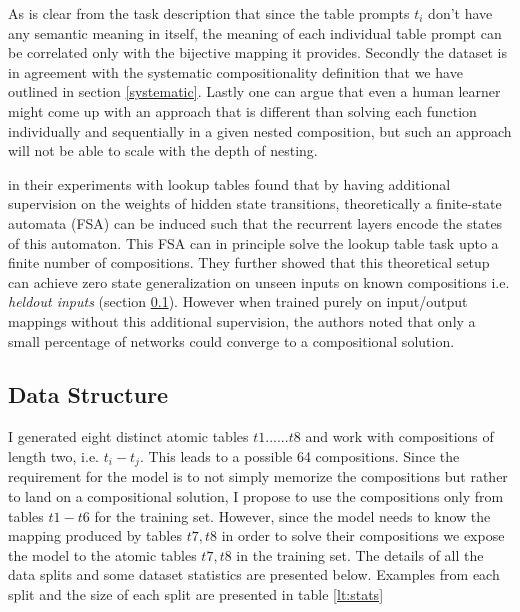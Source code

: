 As is clear from the task description that since the table prompts $t_i$ don't have any semantic meaning in itself, the meaning of each individual table prompt can be correlated only with the bijective mapping it provides. Secondly the dataset is in agreement with the systematic compositionality definition that we have outlined in section \ref{systematic}. Lastly one can argue that even a human learner might come up with an approach that is different than solving each function individually and sequentially in a given nested composition, but such an approach will not be able to scale with the depth of nesting.

\cite{Liska2018} in their experiments with lookup tables found that by having additional supervision on the weights of hidden state transitions, theoretically a finite-state automata (FSA) can be induced such that the recurrent layers encode the states of this automaton. This FSA can in principle solve the lookup table task upto a finite number of compositions. They further showed that this theoretical setup can achieve zero state generalization on unseen inputs on known compositions i.e. \textit{heldout inputs} (section \ref{lt:splits}). However when trained purely on input/output mappings without this additional supervision, the authors noted that only a small percentage of networks could converge to a compositional solution.


\subsection{Data Structure}\label{lt:splits}
I generated eight distinct atomic tables $t1......t8$ and work with compositions of length two, i.e. $t_i - t_j$. This leads to a possible 64 compositions. Since the requirement for the model is to not simply memorize the compositions but rather to land on a compositional solution, I propose to use the compositions only from tables $t1 - t6$ for the training set. However, since the model needs to know the mapping produced by tables $t7, t8$ in order to solve their compositions we expose the model to the atomic tables $t7, t8$ in the training set. The details of all the data splits and some dataset statistics are presented below. Examples from each split and the size of each split are presented in table \ref{lt:stats}

